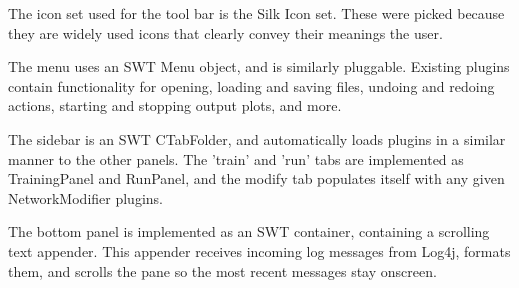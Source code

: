 \documentclass{acm_proc_article-sp}
\begin{document}
{The icon set used for the tool bar is the Silk Icon set\cite{famfamfam}. These were picked because they are widely used icons that clearly convey their meanings the user.

The menu uses an SWT Menu object, and is similarly pluggable. Existing plugins contain functionality for opening, loading and saving files, undoing and redoing actions, starting and stopping output plots, and more.

The sidebar is an SWT CTabFolder, and automatically loads plugins in a similar manner to the other panels. The 'train' and 'run' tabs are implemented as TrainingPanel and RunPanel, and the modify tab populates itself with any given NetworkModifier plugins.

The bottom panel is implemented as an SWT container, containing a scrolling text appender. This appender receives incoming log messages from Log4j, formats them, and scrolls the pane so the most recent messages stay onscreen.
}
\end{document}
